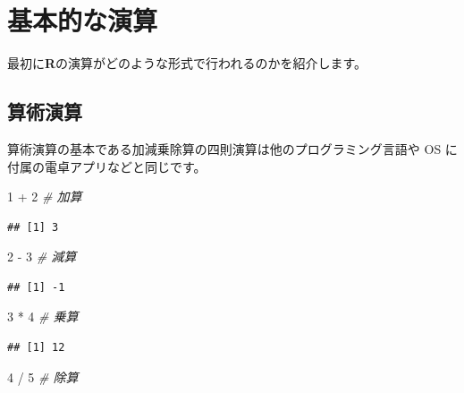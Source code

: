 \documentclass[
  12pt,
]{book}
\newenvironment{Shaded}{\begin{snugshade}}{\end{snugshade}}
\newcommand{\CommentTok}[1]{\textcolor[rgb]{0.56,0.35,0.01}{\textit{#1}}}
\newcommand{\DecValTok}[1]{\textcolor[rgb]{0.00,0.00,0.81}{#1}}
\newcommand{\SpecialCharTok}[1]{\textcolor[rgb]{0.00,0.00,0.00}{#1}}
\begin{document}
\hypertarget{ux57faux672cux7684ux306aux6f14ux7b97}{%
\section{基本的な演算}\label{ux57faux672cux7684ux306aux6f14ux7b97}}

最初に\textbf{R}の演算がどのような形式で行われるのかを紹介します。

\hypertarget{ux7b97ux8853ux6f14ux7b97}{%
\subsection{算術演算}\label{ux7b97ux8853ux6f14ux7b97}}

算術演算の基本である加減乗除算の四則演算は他のプログラミング言語や OS に付属の電卓アプリなどと同じです。

\begin{Shaded}
\begin{Highlighting}[numbers=left,,]
\DecValTok{1} \SpecialCharTok{+} \DecValTok{2}     \CommentTok{\# 加算}
\end{Highlighting}
\end{Shaded}

\begin{verbatim}
## [1] 3
\end{verbatim}

\begin{Shaded}
\begin{Highlighting}[numbers=left,,]
\DecValTok{2} \SpecialCharTok{{-}} \DecValTok{3}     \CommentTok{\# 減算}
\end{Highlighting}
\end{Shaded}

\begin{verbatim}
## [1] -1
\end{verbatim}

\begin{Shaded}
\begin{Highlighting}[numbers=left,,]
\DecValTok{3} \SpecialCharTok{*} \DecValTok{4}     \CommentTok{\# 乗算}
\end{Highlighting}
\end{Shaded}

\begin{verbatim}
## [1] 12
\end{verbatim}

\begin{Shaded}
\begin{Highlighting}[numbers=left,,]
\DecValTok{4} \SpecialCharTok{/} \DecValTok{5}     \CommentTok{\# 除算}
\end{Highlighting}
\end{Shaded}
\end{document}
